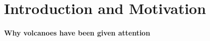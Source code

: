 \documentclass{ametsocV5}
\begin{document}

\section{Introduction and Motivation}


\paragraph*{Why volcanoes have been given attention}
\end{document}
